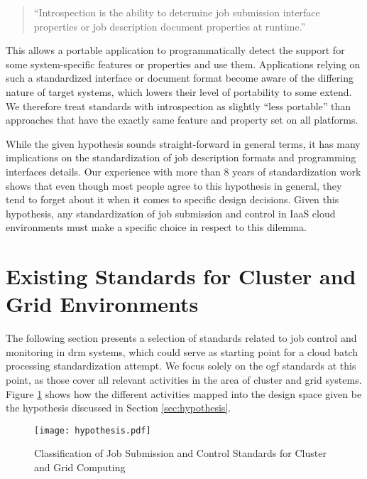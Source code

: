 \documentclass[twocolumn]{svjour3}       %
\begin{document}
\begin{quote}
``Introspection is the ability to determine job submission interface properties or job description document properties at runtime.''
\end{quote}

This allows a portable application to programmatically detect the support for some system-specific features or properties and use them. Applications relying on such a standardized interface or document format become aware of the differing nature of target systems, which lowers their level of portability to some extend. We therefore treat standards with introspection as slightly ``less portable'' than approaches that have the exactly same feature and property set on all platforms.



While the given hypothesis sounds straight-forward in general terms, it has many implications on the standardization of job description formats and programming interfaces details. Our experience with more than 8 years of standardization work shows that even though most people agree to this hypothesis in general, they tend to forget about it when it comes to specific design decisions. Given this hypothesis, any standardization of job submission and control in IaaS cloud environments must make a specific choice in respect to this dilemma.  


\section{Existing Standards for Cluster and Grid Environments}
\label{sec:relatedwork}

The following section presents a selection of standards related to job control and monitoring in \gls{drm} systems, which could serve as starting point for a cloud batch processing standardization attempt. We focus solely on the \gls{ogf} standards at this point, as those cover all relevant activities in the area of cluster and grid systems. Figure \ref{fig:hypothesis} shows how the different activities mapped into the design space given be the hypothesis discussed in Section \ref{sec:hypothesis}.

\begin{figure}
  \texttt{[image: hypothesis.pdf]}
\caption{Classification of Job Submission and Control Standards for Cluster and Grid Computing}
\label{fig:hypothesis} 
\end{figure}
\end{document}

